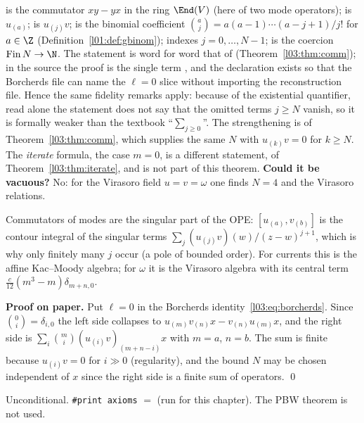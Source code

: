 \begin{dictionary}
 is the commutator $xy-yx$ in the ring $\End(V)$ (here of two mode operators);
 is $u_{(a)}$;  is $u_{(j)}v$;  is the binomial coefficient
$\binom aj = a(a-1)\cdots(a-j+1)/j!$ for $a\in\Z$ (Definition~\ref{l01:def:gbinom});  indexes $j = 0,\dots,N-1$;
 is the coercion $\mathrm{Fin}\,N\to\N$. The statement is word for word that of 
(Theorem~\ref{l03:thm:comm}); in the source the proof is the single term , and the
declaration exists so that the Borcherds file can name the $\ell = 0$ slice without importing the reconstruction file.
Hence the same fidelity remarks apply: because of the existential quantifier, read alone the statement does not say that
the omitted terms $j\ge N$ vanish, so it is formally weaker than the textbook ``$\sum_{j\ge0}$''. The strengthening is
 of Theorem~\ref{l03:thm:comm}, which supplies the same $N$ with $u_{(k)}v = 0$ for $k\ge N$. The
\emph{iterate} formula, the case $m=0$, is a different statement,  of
Theorem~\ref{l03:thm:iterate}, and is not part of this theorem. \textbf{Could it be vacuous?} No: for the
Virasoro field $u=v=\omega$ one finds $N = 4$ and the Virasoro relations.
\end{dictionary}

\begin{physics}
Commutators of modes are the singular part of the OPE: $[u_{(a)},v_{(b)}]$ is the contour integral of the
singular terms $\sum_j(u_{(j)}v)(w)/(z-w)^{j+1}$, which is why only finitely many $j$ occur (a pole of bounded order).
For currents this is the affine Kac--Moody algebra; for $\omega$ it is the Virasoro algebra with its central term
$\tfrac c{12}(m^3-m)\delta_{m+n,0}$.
\end{physics}

\textbf{Proof on paper.} Put $\ell=0$ in the Borcherds identity~\eqref{l03:eq:borcherds}. Since
$\binom0i = \delta_{i,0}$ the left side collapses to $u_{(m)}v_{(n)}x - v_{(n)}u_{(m)}x$, and the right side is
$\sum_i\binom mi(u_{(i)}v)_{(m+n-i)}x$ with $m=a$, $n=b$. The sum is finite because $u_{(i)}v = 0$ for $i\gg0$ (regularity),
and the bound $N$ may be chosen independent of $x$ since the right side is a finite sum of operators. \qed

\begin{status}
Unconditional. \texttt{\#print axioms}  $=$
\lean{[propext, Classical.}\allowbreak{}\allowbreak\lean{sound]} (run for this chapter). The PBW theorem  is not used.
\end{status}

